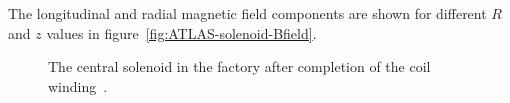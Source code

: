 The longitudinal and radial magnetic field components are shown for different $R$ and $z$ values in figure~\ref{fig:ATLAS-solenoid-Bfield}.

\begin{figure}[htbp]
	\centering
	\caption[The central solenoid in the factory after completion of the coil winding.]{The central solenoid in the factory after completion of the coil winding~\cite{atlasphotos}.}
	\label{fig:solenoid}
\end{figure}

